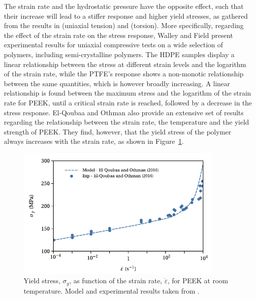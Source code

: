 
The strain rate and the hydrostatic pressure have the opposite effect, such that their increase will lead to a stiffer response and higher yield stresses, as gathered from the results in \cite{popelarViscoelasticMaterialCharacterization1990} (uniaxial tension) and \cite{trussEffectHydrostaticPressure1981} (torsion).
More specifically, regarding the effect of the strain rate on the stress response, Walley and Field \citep{walleyStrainRateSensitivity1994} present experimental results for uniaxial compressive tests on a wide selection of polymers, including semi-crystalline polymers.
The HDPE samples display a linear relationship between the stress at different strain levels and the logarithm of the strain rate, while the PTFE's response shows a non-monotic relationship between the same quantities, which is however broadly increasing.
A linear relationship is found between the maximum stress and the logarithm of the strain rate for PEEK, until a critical strain rate is reached, followed by a decrease in the stress response.
El-Qoubaa and Othman \citep{el-qoubaaStrainRateSensitivity2016} also provide an extensive set of results regarding the relationship between the strain rate, the temperature and the yield strength of PEEK.
They find, however, that the yield stress of the polymer always increases with the strain rate, as shown in Figure~\ref{fig:yield_el_qoubaa_peek}.
\begin{figure}[hbtp]
    \centering
    \includegraphics[width=0.9\textwidth]{figures/yield_el_qoubaa_peek}
    \caption{Yield stress, $\sigma_y$, as function of the strain rate, $\dot \varepsilon$, for PEEK at room temperature. Model and experimental results taken from \cite{el-qoubaaStrainRateSensitivity2016}.}
\label{fig:yield_el_qoubaa_peek}
\end{figure}


